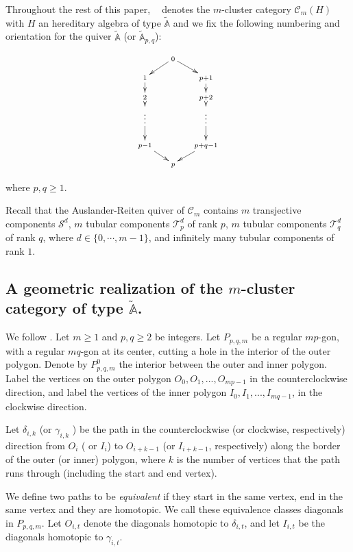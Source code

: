 \documentclass{amsart}
\theoremstyle{plain}
\theoremstyle{definition}
\begin{document}
Throughout the rest of this paper,  ${\mathop{\mathcal{C}_m}\nolimits}$ denotes the $m$-cluster category  $\mathcal{C}_m(H)$ with $H$ an hereditary algebra of type $\tilde{\mathbb{A}}$ and we fix the following numbering and orientation  for the quiver  $\widetilde{\mathbb{A}}$ (or  $\widetilde{\mathbb{A}}_{p,q}$):

$$  \xymatrix@R=.3cm@C=.5cm  {  & \scriptstyle{ 0} \ar[dr] \ar[dl]& \\
               \scriptstyle{1}\ar[d] & & \scriptstyle{p+1} \ar[d] \\
                \scriptstyle{2} \ar[d] && \scriptstyle{p+2} \ar[d] \\
                \scriptstyle{\vdots} \ar[d] && \scriptstyle{\vdots} \ar[d] \\
                  \scriptstyle{p-1} \ar[dr] &&  \scriptstyle{p+q-1} \ar[dl] \\
                  & \scriptstyle{p} &}$$

where $p,q\geq 1$.

 Recall that  the Auslander-Reiten  quiver of $\mathcal{C}_m$ contains $m$ transjective components $\mathcal{S}^d$, $m$ tubular components  $\mathcal{T}^d_p$ of rank $p$,  $m$ tubular components $\mathcal{T}^d_q$ of rank $q$,  where $d\in \{0, \cdots, m-1\}$,  and infinitely many tubular components of  rank $1$.

\subsection{A geometric realization of the $m$-cluster category of type $\tilde{\mathbb{A}}$.} We follow \cite{T12-arxiv}. Let $m \geq 1$ and  $p, q \geq2$ be integers. Let $P_{p,q,m}$ be a
regular $mp$-gon, with a regular $mq$-gon at its center, cutting a hole in the interior of
the outer polygon. Denote by $P_{p,q,m}^0$ the interior between the outer and inner polygon. Label the vertices on the outer polygon $O_0,O_1,...,O_{mp-1}$ in the counterclockwise direction, and label the vertices of the inner polygon $I_0,I_1,...,I_{mq-1}$, in the clockwise direction.

Let $\delta_{i,k}$   (or  $\gamma_{i,k}$ ) be the path in the counterclockwise (or clockwise, respectively) direction from $O_i$ ( or $I_i$) to $O_{i+k-1}$ (or $I_{i+k-1}$, respectively) along the border of the outer (or inner) polygon, where $k$ is the number of vertices that the path runs through (including the start and end vertex). 

We define two paths to be \emph{equivalent} if they start in the same vertex,
end in the same vertex and they are homotopic. We call these equivalence classes
diagonals in $P_{p,q,m}$. Let $O_{i,t}$ denote the diagonals homotopic to $\delta_{i,t}$, and let $I_{i,t}$ be the diagonals homotopic to $\gamma_{i,t}$.
\end{document}
